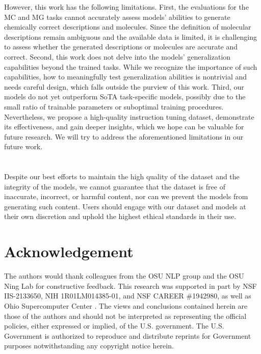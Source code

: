 However, this work has the following limitations.
First, the evaluations for the MC and MG tasks cannot accurately assess models' abilities to generate chemically correct descriptions and molecules. Since the definition of molecular descriptions remain ambiguous and the available data is limited, it is challenging to assess whether the generated descriptions or molecules are accurate and correct.
Second, this work does not delve into the models' generalization capabilities beyond the trained tasks. While we recognize the importance of such capabilities, how to meaningfully test generalization abilities is nontrivial and needs careful design, which falls outside the purview of this work.
Third, our models do not yet outperform SoTA task-specific models, possibly due to the small ratio of trainable parameters or suboptimal training procedures. 
Nevertheless, we propose a high-quality instruction tuning dataset, demonstrate its effectiveness, and gain deeper insights, which we hope can be valuable for future research.
We will try to address the aforementioned limitations in our future work.

\section*{}
Despite our best efforts to maintain the high quality of the \datasetname dataset and the integrity of the \modelname models, we cannot guarantee that the dataset is free of inaccurate, incorrect, or harmful content, nor can we prevent the models from generating such content. Users should engage with our dataset and models at their own discretion and uphold the highest ethical standards in their use.

\section*{Acknowledgement}

The authors would thank colleagues from the OSU NLP group and the OSU Ning Lab for constructive feedback. This research was supported in part by NSF IIS-2133650, NIH 1R01LM014385-01, and NSF CAREER \#1942980, as well as Ohio Supercomputer Center \citep{OhioSupercomputerCenter1987}. The views and conclusions contained herein are those of the authors and should not be interpreted as representing the official policies, either expressed or implied, of the U.S. government. The U.S. Government is authorized to reproduce and distribute reprints for Government purposes notwithstanding any copyright notice herein.

\newpage

